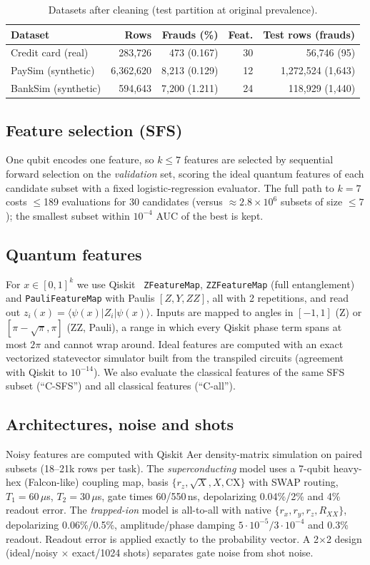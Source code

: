 \documentclass[conference,compsoc]{IEEEtran}
\begin{document}
\begin{table}[t]
\centering
\caption{Datasets after cleaning (test partition at original prevalence).}
\label{tab:data}
\scriptsize
\setlength{\tabcolsep}{3pt}
\begin{tabular}{lrrrr}
\toprule
Dataset & Rows & Frauds (\%) & Feat. & Test rows (frauds)\\
\midrule
Credit card (real) & 283,726 & 473 (0.167) & 30 & 56,746 (95)\\
PaySim (synthetic) & 6,362,620 & 8,213 (0.129) & 12 & 1,272,524 (1,643)\\
BankSim (synthetic) & 594,643 & 7,200 (1.211) & 24 & 118,929 (1,440)\\
\bottomrule
\end{tabular}
\end{table}

\subsection{Feature selection (SFS)}
One qubit encodes one feature, so $k\le7$ features are selected by sequential forward selection on the \emph{validation} set, scoring the ideal quantum features of each candidate subset with a fixed logistic-regression evaluator. The full path to $k=7$ costs $\le$189 evaluations for 30 candidates (versus $\approx2.8\times10^6$ subsets of size $\le7$); the smallest subset within $10^{-4}$ AUC of the best is kept.

\subsection{Quantum features}
For $x\in[0,1]^k$ we use Qiskit~\cite{qiskit2024} \texttt{ZFeatureMap}, \texttt{ZZFeatureMap} (full entanglement) and \texttt{PauliFeatureMap} with Paulis $[Z,Y,ZZ]$, all with 2 repetitions, and read out $z_i(x)=\langle\psi(x)|Z_i|\psi(x)\rangle$. Inputs are mapped to angles in $[-1,1]$ (Z) or $[\pi-\sqrt{\pi},\pi]$ (ZZ, Pauli), a range in which every Qiskit phase term spans at most $2\pi$ and cannot wrap around. Ideal features are computed with an exact vectorized statevector simulator built from the transpiled circuits (agreement with Qiskit to $10^{-14}$). We also evaluate the classical features of the same SFS subset (``C-SFS'') and all classical features (``C-all'').

\subsection{Architectures, noise and shots}
Noisy features are computed with Qiskit Aer density-matrix simulation on paired subsets (18--21k rows per task). The \emph{superconducting} model uses a 7-qubit heavy-hex (Falcon-like) coupling map, basis $\{r_z,\sqrt{X},X,\mathrm{CX}\}$ with SWAP routing, $T_1{=}60\,\mu$s, $T_2{=}30\,\mu$s, gate times 60/550\,ns, depolarizing 0.04\%/2\% and 4\% readout error. The \emph{trapped-ion} model is all-to-all with native $\{r_x,r_y,r_z,R_{XX}\}$, depolarizing 0.06\%/0.5\%, amplitude/phase damping $5{\cdot}10^{-5}/3{\cdot}10^{-4}$ and 0.3\% readout. Readout error is applied exactly to the probability vector. A 2$\times$2 design (ideal/noisy $\times$ exact/1024 shots) separates gate noise from shot noise.
\end{document}
